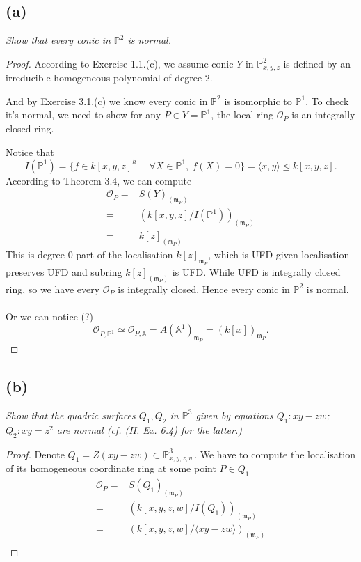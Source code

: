 \subsection{(a)}\textit{Show that every conic in $\mathbb P^2$ is normal.}

\begin{proof}
According to Exercise 1.1.(c), we assume conic $Y$ in $\mathbb P^2_{x,y,z}$ is defined by an irreducible homogeneous polynomial of degree $2$. 

And by Exercise 3.1.(c) we know every conic in $\mathbb P^2$ is isomorphic to $\mathbb P^1$. To check it's normal, we need to show for any $P\in Y=\mathbb P^1$, the local ring $\mathscr O_P$ is an integrally closed ring. 

Notice that 
\[I(\mathbb P^1)=\{f\in k[x,y,z]^h ~\mid~ \forall X\in \mathbb P^1,~ f(X)=0\}=\langle x,y\rangle\trianglelefteq k[x,y,z].\] According to Theorem 3.4, we can compute 
\begin{align*}
	\mathscr O_P =& S(Y)_{(\mathfrak m_P)}\\
	=& (k[x,y,z]/I(\mathbb P^1))_{(\mathfrak m_P)}\\
	=& k[z]_{(\mathfrak m_P)}
\end{align*}
This is degree $0$ part of the localisation $k[z]_{\mathfrak m_P}$, which is UFD given localisation preserves UFD and subring $k[z]_{(\mathfrak m_P)}$ is UFD. While UFD is integrally closed ring, so we have every $\mathscr O_P$ is integrally closed. Hence every conic in $\mathbb P^2$ is normal.\\\\

Or we can notice (?)
\[\mathscr O_{P,\mathbb P^1}\simeq \mathscr O_{P,\mathbb A}=A(\mathbb A^1)_{\mathfrak m_P}=(k[x])_{\mathfrak m_P}.\]

\end{proof}

\subsection{(b)}
\textit{Show that the quadric surfaces $Q_1,Q_2$ in $\mathbb P^3$ given by equations $Q_1: xy-zw$; $Q_2:xy=z^2$ are normal (cf. (II. Ex. 6.4) for the latter.)}

\begin{proof}
	Denote $Q_1=Z(xy-zw)\subset \mathbb P^3_{x,y,z,w}$. We have to compute the localisation of its homogeneous coordinate ring at some point $P\in Q_1$
	\begin{align*}
		\mathscr O_P =& S(Q_1)_{(\mathfrak m_P)}\\
		=& (k[x,y,z,w]/I(Q_1))_{(\mathfrak m_P)}\\
		=& (k[x,y,z,w]/\langle xy-zw\rangle)_{(\mathfrak m_P)}\\
	\end{align*}

\end{proof}

